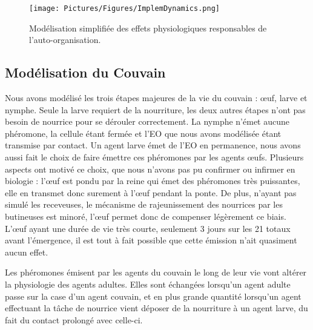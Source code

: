 			
			\begin{figure}
			\centering
			\texttt{[image: Pictures/Figures/ImplemDynamics.png]}
			\caption[Notre modélisation de la physiologie de l'abeille adulte.]{Modélisation simplifiée des effets physiologiques responsables de l'auto-organisation.}
			\label{HJEODynamics}
			\end{figure}
		
		
		\subsection{Modélisation du Couvain}
		
			Nous avons modélisé les trois étapes majeures de la vie du couvain : œuf, larve et nymphe. Seule la larve requiert de la nourriture, les deux autres étapes n'ont pas besoin de nourrice pour se dérouler correctement. La nymphe n'émet aucune phéromone, la cellule étant fermée et l'EO que nous avons modélisée étant transmise par contact. Un agent larve émet de l'EO en permanence, nous avons aussi fait le choix de faire émettre ces phéromones par les agents œufs. Plusieurs aspects ont motivé ce choix, que nous n'avons pas pu confirmer ou infirmer en biologie : l'œuf est pondu par la reine qui émet des phéromones très puissantes, elle en transmet donc surement à l'œuf pendant la ponte. De plus, n'ayant pas simulé les receveuses, le mécanisme de rajeunissement des nourrices par les butineuses est minoré, l'œuf permet donc de compenser légèrement ce biais. L'œuf ayant une durée de vie très courte, seulement 3 jours sur les 21 totaux avant l'émergence, il est tout à fait possible que cette émission n'ait quasiment aucun effet.
			
			Les phéromones émisent par les agents du couvain le long de leur vie vont altérer la physiologie des agents adultes. Elles sont échangées lorsqu'un agent adulte passe sur la case d'un agent couvain, et en plus grande quantité lorsqu'un agent effectuant la tâche de nourrice vient déposer de la nourriture à un agent larve, du fait du contact prolongé avec celle-ci.
		
